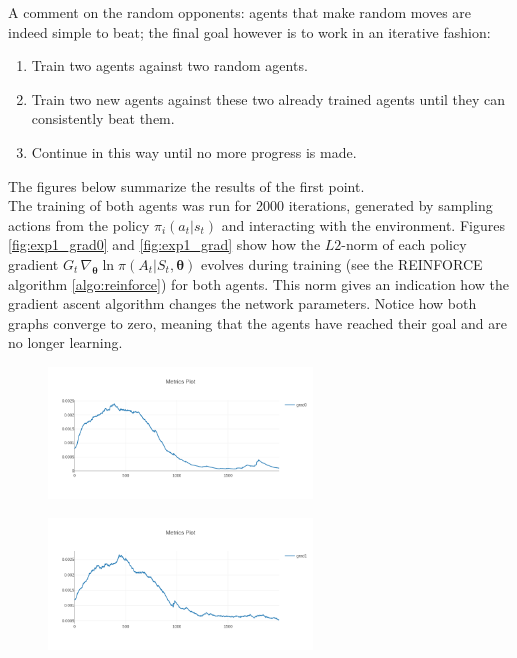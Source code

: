 A comment on the random opponents: agents that make random moves are indeed simple to beat; the final goal however is to work in an iterative fashion: 
\begin{enumerate}
    \item Train two agents against two random agents.
    \item Train two new agents against these two already trained agents until they can consistently beat them.
    \item Continue in this way until no more progress is made.
\end{enumerate}
The figures below summarize the results of the first point.\\

The training of both agents was run for 2000 iterations, generated by sampling actions from the policy $\pi_i(a_t|s_t)$ and interacting with the environment. Figures \ref{fig:exp1_grad0} and \ref{fig:exp1_grad} show how the $L2$-norm of each policy gradient $G_t \, \nabla_{\bm{\theta}} \ln \pi(A_t|S_t,\bm{\theta})$ evolves during training (see the REINFORCE algorithm \ref{algo:reinforce}) for both agents. This norm gives an indication how the gradient ascent algorithm changes the network parameters. Notice how both graphs converge to zero, meaning that the agents have reached their goal and are no longer learning.\\
\begin{figure}
\centering
\begin{minipage}{.5\textwidth}
  \centering
  \includegraphics[width=7cm]{images/experiment3/grad0.png}
  \label{fig:exp1_grad0}
\end{minipage}%
\begin{minipage}{.5\textwidth}
  \centering
  \includegraphics[width=7cm]{images/experiment3/grad1.png}
  \label{fig:exp1_grad1}
\end{minipage}
\end{figure}

